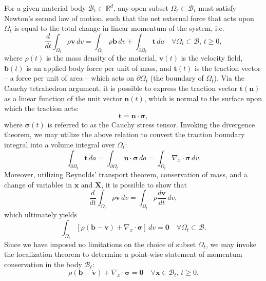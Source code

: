 For a given material body $\mathcal{B}_t \subset \mathbb{R}^d$, any open subset $\Omega_t \subset \mathcal{B}_t$ must satisfy Newton's second law of motion, such that the net external force that acts upon $\Omega_t$ is equal to the total change in linear momentum of the system, i.e.
\begin{equation}
  \frac{d}{dt} \int_{\Omega_t} \rho \mathbf{v} \, dv = \int_{\Omega_t} \rho \mathbf{b} \, dv + \int_{\partial \Omega_t} \mathbf{t} \, da \quad \forall \Omega_t \subset \mathcal{B}, \, t \geq 0,
\end{equation}
where $\rho(t)$ is the mass density of the material, $\mathbf{v}(t)$ is the velocity field, $\mathbf{b}(t)$ is an applied body force per unit of mass, and $\mathbf{t}(t)$ is the traction vector -- a force per unit of area -- which acts on $\partial \Omega_t$ (the boundary of $\Omega_t$). Via the Cauchy tetrahedron argument, it is possible to express the traction vector $\mathbf{t} (\mathbf{n})$ as a linear function of the unit vector $\mathbf{n}(t)$, which is normal to the surface upon which the traction acts:
\begin{equation}
  \mathbf{t} = \mathbf{n} \cdot \boldsymbol{\sigma},
\end{equation}
where $\boldsymbol{\sigma}(t)$ is referred to as the Cauchy stress tensor. Invoking the divergence theorem, we may utilize the above relation to convert the traction boundary integral into a volume integral over $\Omega_t$:
\begin{equation}
  \int_{\partial \Omega_t} \mathbf{t} \, da = \int_{\partial \Omega_t} \mathbf{n} \cdot \boldsymbol{\sigma} \, da = \int_{\Omega_t} \nabla_x \cdot \boldsymbol{\sigma} \, dv.
\end{equation}
Moreover, utilizing Reynolds' transport theorem, conservation of mass, and a change of variables in $\mathbf{x}$ and $\mathbf{X}$, it is possible to show that
\begin{equation}
  \frac{d}{dt} \int_{\Omega_t} \rho \mathbf{v} \, dv = \int_{\Omega_t} \rho \frac{d \mathbf{v}}{dt} \, dv,
\end{equation}
which ultimately yields
\begin{equation}
  \int_{\Omega_t} \left[ \rho (\mathbf{b} - \dot{\mathbf{v}}) + \nabla_x \cdot \boldsymbol{\sigma} \right] \, dv = \mathbf{0} \quad \forall \Omega_t \subset \mathcal{B}.
\end{equation}
Since we have imposed no limitations on the choice of subset $\Omega_t$, we may invoke the localization theorem to determine a point-wise statement of momentum conservation in the body $\mathcal{B}_t$:
\begin{equation}
  \rho (\mathbf{b} - \dot{\mathbf{v}}) + \nabla_x \cdot \boldsymbol{\sigma} = \mathbf{0} \quad \forall \mathbf{x} \in \mathcal{B}_t, \, t \geq 0.
\end{equation}

